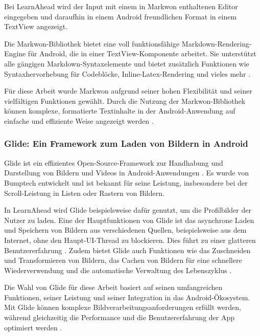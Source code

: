 \noindent
Bei LearnAhead wird der Input mit einem in Markwon enthaltenen Editor eingegeben und daraufhin in einem Android freundlichen Format in einem TextView angezeigt. \newline

\noindent
Die Markwon-Bibliothek bietet eine voll funktionsfähige Markdown-Rendering-Engine für Android, die in einer TextView-Komponente arbeitet. Sie unterstützt alle gängigen Markdown-Syntaxelemente und bietet zusätzlich Funktionen wie Syntaxhervorhebung für Codeblöcke, Inline-Latex-Rendering und vieles mehr \cite{Markwon2022}. \newline

\noindent
Für diese Arbeit wurde Markwon aufgrund seiner hohen Flexibilität und seiner vielfältigen Funktionen gewählt. Durch die Nutzung der Markwon-Bibliothek können komplexe, formatierte Textinhalte in der Android-Anwendung auf einfache und effiziente Weise angezeigt werden \cite{Markwon2022}.

\subsubsection{Glide: Ein Framework zum Laden von Bildern in Android}
Glide ist ein effizientes Open-Source-Framework zur Handhabung und Darstellung von Bildern und Videos in Android-Anwendungen \cite{Glide2022}. Es wurde von Bumptech entwickelt und ist bekannt für seine Leistung, insbesondere bei der Scroll-Leistung in Listen oder Rastern von Bildern. \newline

\noindent
In LearnAhead wird Glide beispielsweise dafür genutzt, um die Profilbilder der Nutzer zu laden. Eine der Hauptfunktionen von Glide ist das asynchrone Laden und Speichern von Bildern aus verschiedenen Quellen, beispielsweise aus dem Internet, ohne den Haupt-\ac{UI}-Thread zu blockieren. Dies führt zu einer glatteren Benutzererfahrung \cite{Glide2022}. Zudem bietet Glide auch Funktionen wie das Zuschneiden und Transformieren von Bildern, das Cachen von Bildern für eine schnellere Wiederverwendung und die automatische Verwaltung des Lebenszyklus \cite{GlideGithub2022}. \newline

\noindent
Die Wahl von Glide für diese Arbeit basiert auf seinen umfangreichen Funktionen, seiner Leistung und seiner Integration in das Android-Ökosystem. Mit Glide können komplexe Bildverarbeitungsanforderungen erfüllt werden, während gleichzeitig die Performance und die Benutzererfahrung der App optimiert werden \cite{Glide2022}.

